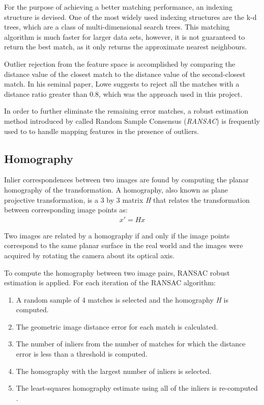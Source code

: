 \documentclass{l4proj}
\begin{document}
For the purpose of achieving a better matching performance, an indexing structure is devised. One of the most widely used indexing structures are the k-d trees, which are a class of multi-dimensional search trees. This matching algorithm is much faster for larger data sets, however, it is not guaranteed to return the best match, as it only returns the approximate nearest neighbours. 

Outlier rejection from the feature space is accomplished by comparing the distance value of the closest match to the distance value of the second-closest match. In his seminal paper, Lowe suggests to reject all the matches with a distance ratio greater than 0.8, which was the approach used in this project. 

In order to further eliminate the remaining error matches, a robust estimation method introduced by \citet{Fischler81} called Random Sample Consensus (\textit{RANSAC}) is frequently used to to handle mapping features in the presence of outliers. 


\subsection{Homography}

Inlier correspondences between two images are found by computing the planar homography of the transformation. A homography, also known as plane projective transformation, is a 3 by 3 matrix \textit{H} that relates the transformation between corresponding image points as:
\begin{align}
x'=Hx 
\end{align}

Two images are related by a homography if and only if the image points correspond to the same planar surface in the real world and the images were acquired by rotating the camera about its optical axis. 

To compute the homography between two image pairs, RANSAC robust estimation is applied. For each iteration of the RANSAC algorithm:

\begin{enumerate}
    \item A random sample of 4 matches is selected and the homography \textit{H} is computed.
    \item The geometric image distance error for each match is calculated.
    \item The number of inliers from the number of matches for which the distance error is less than a threshold is computed.
    \item The homography with the largest number of inliers is selected.
    \item The least-squares homography estimate using all of the inliers is re-computed \citep{Torr2000}.
    
\end{enumerate}
\end{document}
